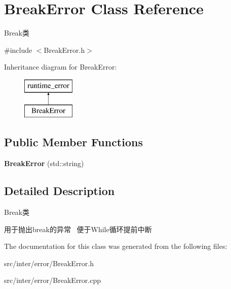 \hypertarget{class_break_error}{}\section{Break\+Error Class Reference}
\label{class_break_error}


Break类  




{\ttfamily \#include $<$Break\+Error.\+h$>$}

Inheritance diagram for Break\+Error\+:\begin{figure}[H]
\begin{center}
\leavevmode
\includegraphics[height=2.000000cm]{class_break_error}
\end{center}
\end{figure}
\subsection*{Public Member Functions}
\begin{DoxyCompactItemize}
\item 
\mbox{\label{class_break_error_a94dc77c2e9e9088a44b073a9eda03833}} 
{\bfseries Break\+Error} (std\+::string)
\end{DoxyCompactItemize}


\subsection{Detailed Description}
Break类 

用于抛出break的异常~\newline
便于\+While循环提前中断 

The documentation for this class was generated from the following files\+:\begin{DoxyCompactItemize}
\item 
src/inter/error/Break\+Error.\+h\item 
src/inter/error/Break\+Error.\+cpp\end{DoxyCompactItemize}
